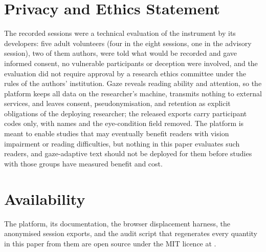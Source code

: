 \documentclass[sigconf,screen]{acmart}
\begin{document}
\maketitle
\ifdefined\readinglayout
  \pagestyle{standardpagestyle}
\fi








\section*{Privacy and Ethics Statement}
The recorded sessions were a technical evaluation of the instrument by its developers: five adult volunteers (four in the eight sessions, one in the advisory session), two of them authors, were told what would be recorded and gave informed consent, no vulnerable participants or deception were involved, and the evaluation did not require approval by a research ethics committee under the rules of the authors' institution.
Gaze reveals reading ability and attention, so the platform keeps all data on the researcher's machine, transmits nothing to external services, and leaves consent, pseudonymisation, and retention as explicit obligations of the deploying researcher; the released exports carry participant codes only, with names and the eye-condition field removed.
The platform is meant to enable studies that may eventually benefit readers with vision impairment or reading difficulties, but nothing in this paper evaluates such readers, and gaze-adaptive text should not be deployed for them before studies with those groups have measured benefit and cost.

\section*{Availability}
The platform, its documentation, the browser displacement harness, the anonymised session exports, and the audit script that regenerates every quantity in this paper from them are open source under the MIT licence at .
\end{document}
